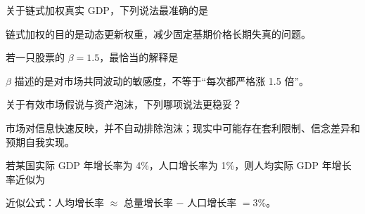 \begin{question}
关于链式加权真实 GDP，下列说法最准确的是
\begin{choiceoptions}[1]
\end{choiceoptions}
\begin{solution}
链式加权的目的是动态更新权重，减少固定基期价格长期失真的问题。
\end{solution}
\end{question}

\begin{question}
若一只股票的 $\beta=1.5$，最恰当的解释是
\begin{choiceoptions}[2]
\end{choiceoptions}
\begin{solution}
$\beta$ 描述的是对市场共同波动的敏感度，不等于“每次都严格涨 1.5 倍”。
\end{solution}
\end{question}

\begin{question}
关于有效市场假说与资产泡沫，下列哪项说法更稳妥？
\begin{choiceoptions}[1]
\end{choiceoptions}
\begin{solution}
市场对信息快速反映，并不自动排除泡沫；现实中可能存在套利限制、信念差异和预期自我实现。
\end{solution}
\end{question}

\begin{question}
若某国实际 GDP 年增长率为 4\%，人口增长率为 1\%，则人均实际 GDP 年增长率近似为
\begin{choiceoptions}[2]
\end{choiceoptions}
\begin{solution}
近似公式：人均增长率 $\approx$ 总量增长率 $-$ 人口增长率 $=3\%$。
\end{solution}
\end{question}

